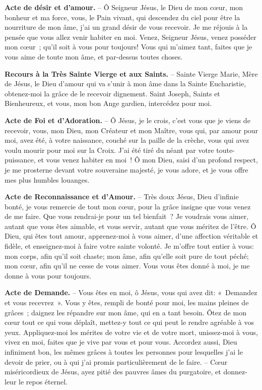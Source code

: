 \textbf{Acte de désir et d’amour.} – Ô Seigneur Jésus, le Dieu de mon cœur, mon bonheur et ma force, vous, le Pain vivant, qui descendez du ciel pour être la nourriture de mon âme, j’ai un grand désir de vous recevoir. Je me réjouis à la pensée que vous allez venir habiter en moi. Venez, Seigneur Jésus, venez posséder mon cœur~; qu’il soit à vous pour toujours! Vous qui m’aimez tant, faites que je vous aime de toute mon âme, et par-dessus toutes choses.

\textbf{Recours à la Très Sainte Vierge et aux Saints.} – Sainte Vierge Marie, Mère de Jésus, le Dieu d’amour qui va s’unir à mon âme dans la Sainte Eucharistie, obtenez-moi la grâce de le recevoir dignement. Saint Joseph, Saints et Bienheureux, et vous, mon bon Ange gardien, intercédez pour moi.\par\vspace{0.2cm}
\begin{center}\end{center}

\textbf{Acte de Foi et d’Adoration.} – Ô Jésus, je le crois, c’est vous que je viens de recevoir, vous, mon Dieu, mon Créateur et mon Maître, vous qui, par amour pour moi, avez été, à votre naissance, couché sur la paille de la crèche, vous qui avez voulu mourir pour moi sur la Croix. J’ai été tiré du néant par votre toute-puissance, et vous venez habiter en moi~! Ô mon Dieu, saisi d’un profond respect, je me prosterne devant votre souveraine majesté, je vous adore, et je vous offre mes plus humbles louanges.

\textbf{Acte de Reconnaissance et d’Amour.} – Très doux Jésus, Dieu d’infinie bonté, je vous remercie de tout mon cœur, pour la grâce insigne que vous venez de me faire. Que vous rendrai-je pour un tel bienfait~? Je voudrais vous aimer, autant que vous êtes aimable, et vous servir, autant que vous méritez de l’être. Ô Dieu, qui êtes tout amour, apprenez-moi à vous aimer, d’une affection véritable et fidèle, et enseignez-moi à faire votre sainte volonté. Je m’offre tout entier à vous: mon corps, afin qu’il soit chaste; mon âme, afin qu’elle soit pure de tout péché; mon cœur, afin qu’il ne cesse de vous aimer. Vous vous êtes donné à moi, je me donne à vous pour toujours.

\textbf{Acte de Demande.} – Vous êtes en moi, ô Jésus, vous qui avez dit: «~Demandez et vous recevrez~». Vous y êtes, rempli de bonté pour moi, les mains pleines de grâces~; daignez les répandre sur mon âme, qui en a tant besoin. Ôtez de mon cœur tout ce qui vous déplaît, mettez-y tout ce qui peut le rendre agréable à vos yeux. Appliquez-moi les mérites de votre vie et de votre mort, unissez-moi à vous, vivez en moi, faites que je vive par vous et pour vous. Accordez aussi, Dieu infiniment bon, les mêmes grâces à toutes les personnes pour lesquelles j’ai le devoir de prier, ou à qui j’ai promis particulièrement de le faire. – Cœur miséricordieux de Jésus, ayez pitié des pauvres âmes du purgatoire, et donnez-leur le repos éternel.



